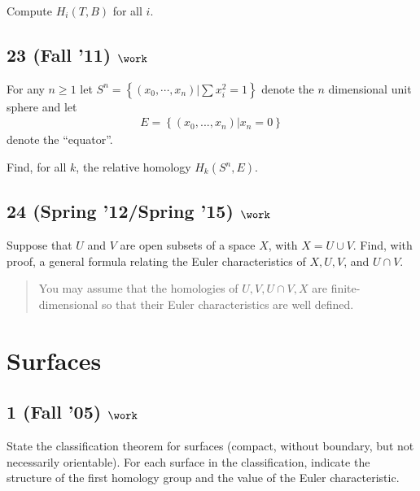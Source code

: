 Compute \(H_i (T, B)\) for all \(i\).

\hypertarget{fall-11-work-2}{%
\subsection{\texorpdfstring{23 (Fall '11)
\(\work\)}{23 (Fall '11) \textbackslash work}}\label{fall-11-work-2}}

For any \(n \geq 1\) let
\(S^n = \left\{{(x_0 , \cdots , x_n )\mathrel{\Big|}\sum x_i^2 =1}\right\}\)
denote the \(n\) dimensional unit sphere and let
\begin{align*}E = \left\{{(x_0 , . . . , x_n )\mathrel{\Big|}x_n = 0}\right\}\end{align*}
denote the ``equator''.

Find, for all \(k\), the relative homology \(H_k (S^n , E)\).

\hypertarget{spring-12spring-15-work}{%
\subsection{\texorpdfstring{24 (Spring '12/Spring '15)
\(\work\)}{24 (Spring '12/Spring '15) \textbackslash work}}\label{spring-12spring-15-work}}

Suppose that \(U\) and \(V\) are open subsets of a space \(X\), with
\(X = U \cup V\). Find, with proof, a general formula relating the Euler
characteristics of \(X, U, V\), and \(U \cap V\).

\begin{quote}
You may assume that the homologies of \(U, V, U \cap V, X\) are
finite-dimensional so that their Euler characteristics are well defined.
\end{quote}

\hypertarget{surfaces}{%
\section{Surfaces}\label{surfaces}}

\hypertarget{fall-05-work-1}{%
\subsection{\texorpdfstring{1 (Fall '05)
\(\work\)}{1 (Fall '05) \textbackslash work}}\label{fall-05-work-1}}

State the classification theorem for surfaces (compact, without
boundary, but not necessarily orientable). For each surface in the
classification, indicate the structure of the first homology group and
the value of the Euler characteristic.

